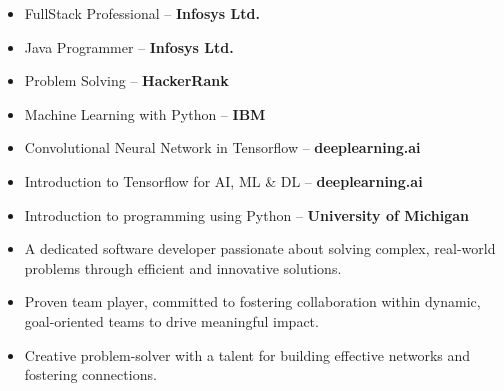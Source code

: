 

\begin{itemize}
    \item FullStack Professional -- \textbf{Infosys Ltd.}
    \item Java Programmer -- \textbf{Infosys Ltd.}
    \item Problem Solving -- \textbf{HackerRank}
    \item Machine Learning with Python -- \textbf{IBM}
    \item Convolutional Neural Network in Tensorflow -- \textbf{deeplearning.ai}
    \item Introduction to Tensorflow for AI, ML \& DL -- \textbf{deeplearning.ai}
    \item Introduction to programming using Python -- \textbf{University of Michigan}
\end{itemize}


\begin{itemize}
    \item A dedicated software developer passionate about solving complex, real-world problems through efficient and innovative solutions. 
    
    \item Proven team player, committed to fostering collaboration within dynamic, goal-oriented teams to drive meaningful impact.
    
    \item Creative problem-solver with a talent for building effective networks and fostering connections.
\end{itemize}







\smallskip


